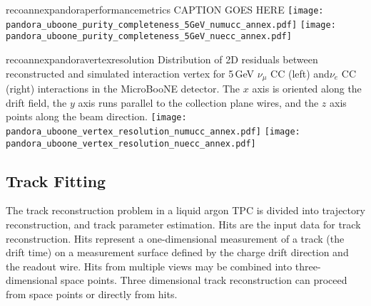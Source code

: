 \begin{cdrfigure}{recoannexpandoraperformancemetrics}
{CAPTION GOES HERE}
\texttt{[image: pandora\_uboone\_purity\_completeness\_5GeV\_numucc\_annex.pdf]}
\texttt{[image: pandora\_uboone\_purity\_completeness\_5GeV\_nuecc\_annex.pdf]}
\end{cdrfigure}

\begin{cdrfigure}{recoannexpandoravertexresolution}
{Distribution of 2D residuals between reconstructed and simulated interaction
 vertex for 5\,GeV $\nu_{\mu}$ CC (left) and$\nu_{e}$ CC (right) interactions in the MicroBooNE detector.
 The $x$ axis is oriented along the drift field, the $y$ axis runs parallel 
 to the collection plane wires, and the $z$ axis points along the beam direction.}
\texttt{[image: pandora\_uboone\_vertex\_resolution\_numucc\_annex.pdf]}
\texttt{[image: pandora\_uboone\_vertex\_resolution\_nuecc\_annex.pdf]}
\end{cdrfigure}


\subsection{Track Fitting}

The track reconstruction problem in a liquid argon TPC is divided
into trajectory reconstruction, and track parameter estimation.
Hits are the input data for track reconstruction. Hits represent a
one-dimensional measurement of a track (the drift time) on a
measurement surface defined by the charge drift direction and the
readout wire. Hits from multiple views may be combined into
three-dimensional space points. Three dimensional track reconstruction
can proceed from space points or directly from hits.

